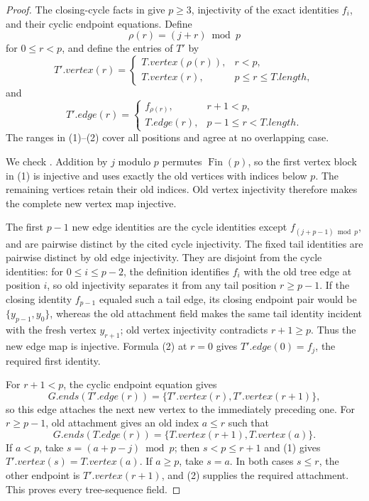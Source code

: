 \begin{proof}
The closing-cycle facts in  give
$p\geq3$, injectivity of the exact identities $f_i$, and their cyclic
endpoint equations.  Define
\[
 \rho(r)=(j+r)\bmod p
\]
for $0\leq r<p$, and define the entries of $T'$ by
\[
 T'.vertex(r)=
 \begin{cases}
  T.vertex(\rho(r)),&r<p,\\
  T.vertex(r),&p\leq r\leq T.length,
 \end{cases}                                                    \tag{1}
\]
and
\[
 T'.edge(r)=
 \begin{cases}
  f_{\rho(r)},&r+1<p,\\
  T.edge(r),&p-1\leq r<T.length.
 \end{cases}                                                    \tag{2}
\]
The ranges in (1)--(2) cover all positions and agree at no overlapping
case.

We check .  Addition by $j$ modulo $p$ permutes
$\operatorname{Fin}(p)$, so the first vertex block in (1) is injective and
uses exactly the old vertices with indices below $p$.  The remaining
vertices retain their old indices.  Old vertex injectivity therefore makes
the complete new vertex map injective.

The first $p-1$ new edge identities are the cycle identities except
$f_{(j+p-1)\bmod p}$, and are pairwise distinct by the cited cycle
injectivity.  The fixed tail identities are pairwise distinct by old edge
injectivity.  They are disjoint from the cycle identities: for
$0\leq i\leq p-2$, the definition  identifies
$f_i$ with the old tree edge at position $i$, so old injectivity separates
it from any tail position $r\geq p-1$.  If the closing identity
$f_{p-1}$ equaled such a tail edge, its closing endpoint pair would be
$\{y_{p-1},y_0\}$, whereas the old attachment field makes the same tail
identity incident with the fresh vertex $y_{r+1}$; old vertex injectivity
contradicts $r+1\geq p$.  Thus the new edge map is injective.  Formula (2)
at $r=0$ gives $T'.edge(0)=f_j$, the required first identity.

For $r+1<p$, the cyclic endpoint equation gives
\[
 G.ends(T'.edge(r))=
 \{T'.vertex(r),T'.vertex(r+1)\},                               \tag{3}
\]
so this edge attaches the next new vertex to the immediately preceding
one.  For $r\geq p-1$, old attachment gives an old index $a\leq r$ such
that
\[
 G.ends(T.edge(r))=\{T.vertex(r+1),T.vertex(a)\}.
\]
If $a<p$, take $s=(a+p-j)\bmod p$; then $s<p\leq r+1$ and (1) gives
$T'.vertex(s)=T.vertex(a)$.  If $a\geq p$, take $s=a$.  In both cases
$s\leq r$, the other endpoint is $T'.vertex(r+1)$, and (2) supplies the
required attachment.  This proves every tree-sequence field.


\end{proof}
